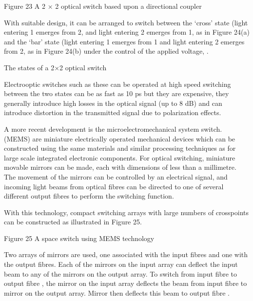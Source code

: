 \documentclass[letterpaper,10pt,english]{sphinxmanual}
\let\sphinxpxdimen\pdfpxdimen\else\newdimen\sphinxpxdimen
\begin{document}
Figure 23 A 2 × 2 optical switch based upon a directional coupler

With suitable design, it can be arranged to switch between the ‘cross’ state (light entering 1 emerges from 2, and light entering 2 emerges from 1, as in Figure 24(a) and the ‘bar’ state (light entering 1 emerges from 1 and light entering 2 emerges from 2, as in Figure 24(b) under the control of the applied voltage, .

\sphinxincludegraphics[width=511\sphinxpxdimen,height=154\sphinxpxdimen]{{t305_023i}.jpg}

The states of a 2×2 optical switch

Electro\sphinxhyphen{}optic switches such as these can be operated at high speed \textendash{} switching between the two states can be as fast as 10 ps \textendash{} but they are expensive, they generally introduce high losses in the optical signal (up to 8 dB) and can introduce distortion in the transmitted signal due to polarization effects.

A more recent development is the micro\sphinxhyphen{}electro\sphinxhyphen{}mechanical system switch.  (MEMS) are miniature electrically operated mechanical devices which can be constructed using the same materials and similar processing techniques as for large scale integrated electronic components. For optical switching, miniature movable mirrors can be made, each with dimensions of less than a millimetre. The movement of the mirrors can be controlled by an electrical signal, and incoming
light beams from optical fibres can be directed to one of several different output fibres to perform the switching function.

With this technology, compact switching arrays with large numbers of crosspoints can be constructed as illustrated in Figure 25.

\sphinxincludegraphics[width=511\sphinxpxdimen,height=347\sphinxpxdimen]{{t305_024i}.jpg}

Figure 25 A space switch using MEMS technology

Two arrays of mirrors are used, one associated with the input fibres and one with the output fibres. Each of the mirrors on the input array can deflect the input beam to any of the mirrors on the output array. To switch from input fibre  to output fibre , the mirror  on the input array deflects the beam from input fibre  to mirror  on the output array. Mirror  then deflects this beam to output fibre .
\end{document}

